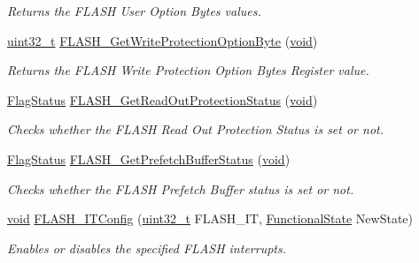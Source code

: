 \begin{DoxyCompactItemize}
\begin{DoxyCompactList}\small\item\em Returns the F\+L\+A\+SH User Option Bytes values. \end{DoxyCompactList}\item 
\hyperlink{_p_e___types_8h_a33594304e786b158f3fb30289278f5af}{uint32\+\_\+t} \hyperlink{group___f_l_a_s_h___private___functions_gac009e061562c7d36d7d2d00bb1c8aafa}{F\+L\+A\+S\+H\+\_\+\+Get\+Write\+Protection\+Option\+Byte} (\hyperlink{usb__devapi_8h_afabf60e7f57651d6d595a02c75f07cd0}{void})
\begin{DoxyCompactList}\small\item\em Returns the F\+L\+A\+SH Write Protection Option Bytes Register value. \end{DoxyCompactList}\item 
\hyperlink{agilefox_2library_2inc_2stm32f10x__type_8h_a89136caac2e14c55151f527ac02daaff}{Flag\+Status} \hyperlink{group___f_l_a_s_h___private___functions_ga57fe56770ff25b358f3e36bd70632e37}{F\+L\+A\+S\+H\+\_\+\+Get\+Read\+Out\+Protection\+Status} (\hyperlink{usb__devapi_8h_afabf60e7f57651d6d595a02c75f07cd0}{void})
\begin{DoxyCompactList}\small\item\em Checks whether the F\+L\+A\+SH Read Out Protection Status is set or not. \end{DoxyCompactList}\item 
\hyperlink{agilefox_2library_2inc_2stm32f10x__type_8h_a89136caac2e14c55151f527ac02daaff}{Flag\+Status} \hyperlink{group___f_l_a_s_h___private___functions_ga289bffe7f078d6a130222f03c59bc235}{F\+L\+A\+S\+H\+\_\+\+Get\+Prefetch\+Buffer\+Status} (\hyperlink{usb__devapi_8h_afabf60e7f57651d6d595a02c75f07cd0}{void})
\begin{DoxyCompactList}\small\item\em Checks whether the F\+L\+A\+SH Prefetch Buffer status is set or not. \end{DoxyCompactList}\item 
\hyperlink{usb__devapi_8h_afabf60e7f57651d6d595a02c75f07cd0}{void} \hyperlink{group___f_l_a_s_h___private___functions_ga94c1e51a9c3bf8d48eb6eb4a4d054861}{F\+L\+A\+S\+H\+\_\+\+I\+T\+Config} (\hyperlink{_p_e___types_8h_a33594304e786b158f3fb30289278f5af}{uint32\+\_\+t} F\+L\+A\+S\+H\+\_\+\+IT, \hyperlink{agilefox_2library_2inc_2stm32f10x__type_8h_ac9a7e9a35d2513ec15c3b537aaa4fba1}{Functional\+State} New\+State)
\begin{DoxyCompactList}\small\item\em Enables or disables the specified F\+L\+A\+SH interrupts. \end{DoxyCompactList}\item 

\end{DoxyCompactItemize}
